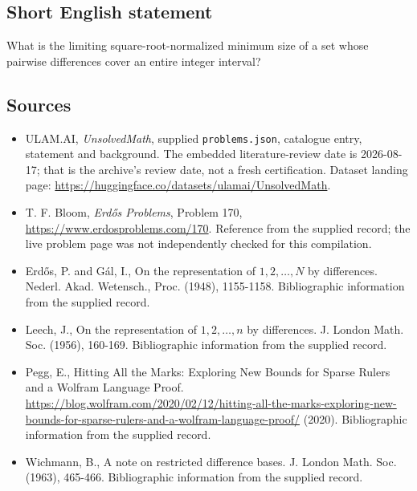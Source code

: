 \documentclass[11pt,a4paper]{article}
\begin{document}
\subsection{Short English statement}

What is the limiting square-root-normalized minimum size of a set whose pairwise differences cover an entire integer interval?

\subsection{Sources}

{\small

\begin{itemize}

\item[\hypertarget{source:statement:1}{S1}] ULAM.AI, \emph{UnsolvedMath}, supplied \texttt{problems.json}, catalogue entry, statement and background. The embedded literature-review date is 2026-08-17; that is the archive’s review date, not a fresh certification. Dataset landing page: \url{https://huggingface.co/datasets/ulamai/UnsolvedMath}.

\item[\hypertarget{source:statement:2}{S2}] T. F. Bloom, \emph{Erdős Problems}, Problem 170, \url{https://www.erdosproblems.com/170}. Reference from the supplied record; the live problem page was not independently checked for this compilation.

\item[\hypertarget{source:statement:3}{S3}] Erd\H{o}s, P. and G\'{a}l, I., On the representation of $1,2,\ldots,N$ by differences. Nederl. Akad. Wetensch., Proc. (1948), 1155-1158. Bibliographic information from the supplied record.

\item[\hypertarget{source:statement:4}{S4}] Leech, J., On the representation of $1,2,\ldots,n$ by differences. J. London Math. Soc. (1956), 160-169. Bibliographic information from the supplied record.

\item[\hypertarget{source:statement:5}{S5}] Pegg, E., Hitting All the Marks: Exploring New Bounds for Sparse Rulers and a Wolfram Language Proof. \url{https://blog.wolfram.com/2020/02/12/hitting-all-the-marks-exploring-new-bounds-for-sparse-rulers-and-a-wolfram-language-proof/} (2020). Bibliographic information from the supplied record.

\item[\hypertarget{source:statement:6}{S6}] Wichmann, B., A note on restricted difference bases. J. London Math. Soc. (1963), 465-466. Bibliographic information from the supplied record.

\end{itemize}

}

\label{end:statement}
\end{document}
